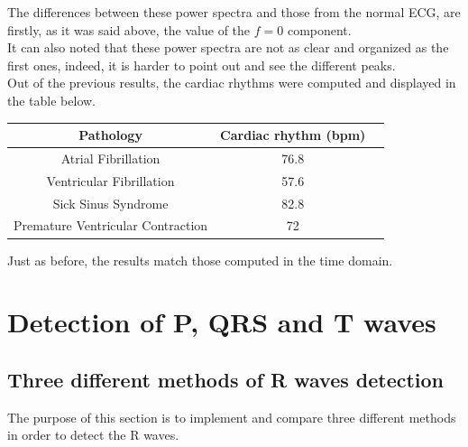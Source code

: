 \documentclass[11pt]{article}
\begin{document}
		The differences between these power spectra and those from the normal ECG, are firstly, as it was said above, the value of the $f=0$ component.\\
		It can also noted that these power spectra are not as clear and organized as the first ones, indeed, it is harder to point out and see the different peaks.
		\\
		Out of the previous results, the cardiac rhythms were computed and displayed in the table below. 
		\begin{center}
			\begin{tabular}{|c|c|c|}
				\hline
				\textbf{Pathology} & \textbf{Cardiac rhythm (bpm)} \\
				\hline
				Atrial Fibrillation & 76.8 \\ 
				\hline
				Ventricular Fibrillation & 57.6 \\
				\hline
				Sick Sinus Syndrome & 82.8 \\
				\hline
				Premature Ventricular Contraction & 72 \\
				\hline
			\end{tabular}
		\end{center}
		\vspace{0.3in}
		Just as before, the results match those computed in the time domain.



\section{Detection of P, QRS and T waves}
	\subsection{Three different methods of R waves detection}
		The purpose of this section is to implement and compare three different methods in order to detect the R waves.
\end{document}
